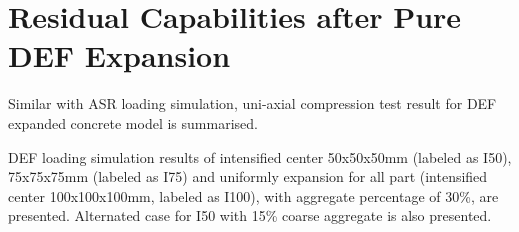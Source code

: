 \clearpage

\section{Residual Capabilities after Pure DEF Expansion}

Similar with ASR loading simulation, uni-axial compression test result for DEF expanded concrete model is summarised.

DEF loading simulation results of intensified center 50x50x50mm (labeled as I50), 75x75x75mm (labeled as I75) and uniformly expansion for all part (intensified center 100x100x100mm, labeled as I100), with aggregate percentage of 30\%, are presented.  Alternated case for I50 with 15\% coarse aggregate is also presented.

